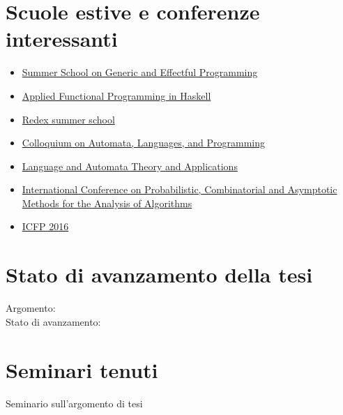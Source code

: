 \documentclass[11pt]{article}
\begin{document}
\section*{Scuole estive e conferenze interessanti}

\begin{itemize}
    \item \href{https://www.cs.ox.ac.uk/projects/utgp/school/index.html}
        {Summer School on Generic and Effectful Programming}
    \item \href{http://www.utrechtsummerschool.nl/courses/science/applied-functional-programming-in-haskell}
        {Applied Functional Programming in Haskell}
    \item \href{http://redex.racket-lang.org/summer-school.html}{Redex summer school}
    \item \href{http://www.easyconferences.eu/icalp2016/}{Colloquium on Automata, Languages, and Programming}
    \item \href{http://grammars.grlmc.com/LATA2016/}{Language and Automata Theory and Applications}
    \item \href{http://www.aofa2016.meetings.pl/}{International Conference on Probabilistic, Combinatorial and Asymptotic Methods 
    for the Analysis of Algorithms}
    \item \href{http://conf.researchr.org/home/icfp-2016}{ICFP 2016}
\end{itemize}


\section*{Stato di avanzamento della tesi}

\begin{description}

\item[Argomento:] 

\item[Stato di avanzamento:] 

\end{description}




\section*{Seminari tenuti}

\begin{description}

\item[%
] 

\item[%
Seminario sull'argomento di tesi] 


\end{description}
\end{document}
